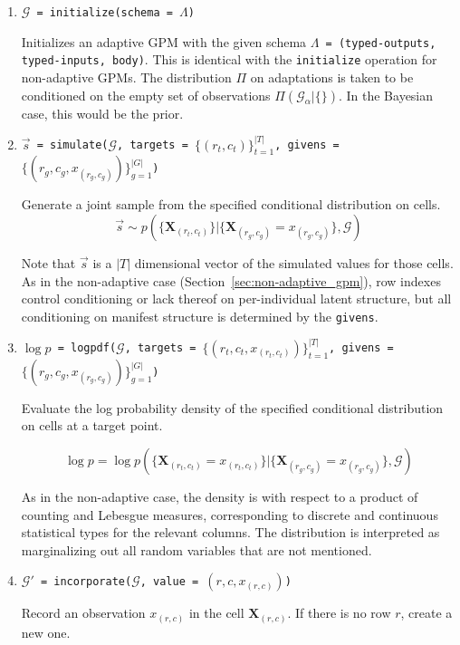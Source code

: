 \documentclass[10pt,letterpaper]{article}
\newcommand{\set}[1]{\{#1\}}
\newcommand{\G}{\mathcal{G}}
\begin{document}
\begin{enumerate}

\item \texttt{$\G$ = initialize(schema = $\Lambda$)}

    Initializes an adaptive GPM with the given schema \texttt{$\Lambda$ =
    (typed-outputs, typed-inputs, body)}.  This is identical with the
    \texttt{initialize} operation for non-adaptive GPMs.  The distribution $\Pi$
    on adaptations is taken to be conditioned on the empty set of observations
    $\Pi(\G_\alpha|\{\})$.  In the Bayesian case, this would be the prior.

\item \texttt{$\vec{s}$ =
    simulate($\G$, targets = $\set{(r_t,c_t)}_{t=1}^{|T|}$, givens
    = $\set{(r_g, c_g, x_{(r_g,c_g)})}_{g=1}^{|G|}$)}

    Generate a joint sample from the specified conditional
    distribution on cells.
    \[
    \vec{s} \sim p( \set{ \mathbf{X}_{(r_t,c_t)} } |
    \set{ \mathbf{X}_{(r_g,c_g)} = x_{(r_g,c_g)} }, \G)
    \]

    Note that $\vec{s}$ is a $|T|$ dimensional vector of the simulated
    values for those cells.  As in the non-adaptive case
    (Section~\ref{sec:non-adaptive_gpm}), row indexes control conditioning
    or lack thereof on per-individual latent structure, but all conditioning
    on manifest structure is determined by the \texttt{givens}.
    
\item \texttt{$\log p$ =
    logpdf($\G$, targets = $\set{(r_t, c_t, x_{(r_t,c_t)})}_{t=1}^{|T|}$,
    givens = $\set{(r_g, c_g, x_{(r_g,c_g)})}_{g=1}^{|G|}$)}

    Evaluate the log probability density of the specified conditional
    distribution on cells at a target point.

    \[
    \log p = \log p( \set{ \mathbf{X}_{(r_t,c_t)} = x_{(r_t,c_t)} } |
    \set{ \mathbf{X}_{(r_g,c_g)} = x_{(r_g,c_g)} }, \G)
    \]

    As in the non-adaptive case, the density is with respect to a
    product of counting and Lebesgue measures, corresponding to
    discrete and continuous statistical types for the relevant
    columns.  The distribution is interpreted as marginalizing out all
    random variables that are not mentioned.

\item \texttt{$\G'$ = incorporate($\G$, value = $(r, c, x_{(r,c)})$)}

    Record an observation $x_{(r,c)}$ in the cell $\mathbf{X}_{(r,c)}$.
    If there is no row $r$, create a new one.


\end{enumerate}
\end{document}
